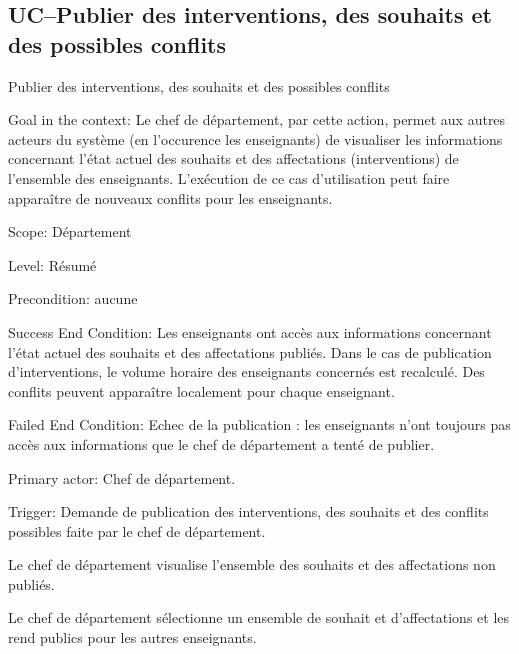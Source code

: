 \begin{ocl}
\subsection{UC\---Publier des interventions, des souhaits et des possibles conflits}

\begin{usecase}{Publier des interventions, des souhaits et des possibles conflits}
\begin{information}
	
\item[{Goal in the context:}]
 Le chef de département, par cette action, permet aux autres acteurs du système (en l'occurence les enseignants) de visualiser les informations concernant l'état actuel des souhaits et des affectations (interventions) de l'ensemble des enseignants. 
L'exécution de ce cas d'utilisation peut faire apparaître de nouveaux conflits pour les enseignants.

\item[{Scope:}] Département

 \item[{Level:}] Résumé

 \item[Precondition:] aucune

 \item[{Success End Condition:}]
 Les enseignants ont accès aux informations concernant l'état actuel des souhaits et des affectations publiés. Dans le cas de publication d'interventions, le volume horaire des enseignants concernés est recalculé. Des conflits peuvent apparaître localement pour chaque enseignant.

 \item[{Failed End Condition:}]
 Echec de la publication : les enseignants n'ont toujours pas accès aux informations que le chef de département a tenté de publier.

 \item[{Primary actor:}]
 Chef de département.

 \item[{Trigger:}]
 Demande de publication des interventions, des souhaits et des conflits possibles faite par le chef de département.
\end{information}

\begin{scenario}
\item Le chef de département visualise l'ensemble des souhaits et des affectations non publiés.
 \item Le chef de département sélectionne un ensemble de souhait et d'affectations et les rend publics pour les autres enseignants.
\end{scenario}


\end{usecase}
\end{ocl}
